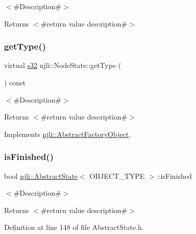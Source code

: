 $<$\#\+Description\#$>$

\begin{DoxyReturn}{Returns}
$<$\#return value description\#$>$ 
\end{DoxyReturn}
\mbox{\label{classnjli_1_1_node_state_a58607b67974806152c3483b40786b2de}} 
\subsubsection{\texorpdfstring{get\+Type()}{getType()}}
{\footnotesize\ttfamily virtual \mbox{\hyperlink{_util_8h_aa62c75d314a0d1f37f79c4b73b2292e2}{s32}} njli\+::\+Node\+State\+::get\+Type (\begin{DoxyParamCaption}{ }\end{DoxyParamCaption}) const\hspace{0.3cm}{\ttfamily [virtual]}}

$<$\#\+Description\#$>$

\begin{DoxyReturn}{Returns}
$<$\#return value description\#$>$ 
\end{DoxyReturn}


Implements \mbox{\hyperlink{classnjli_1_1_abstract_factory_object_a207c86146d40d0794708ae7f2d4e60a7}{njli\+::\+Abstract\+Factory\+Object}}.

\mbox{\label{classnjli_1_1_node_state_a4c7007210237496fbe169ba114c3750d}} 
\subsubsection{\texorpdfstring{is\+Finished()}{isFinished()}}
{\footnotesize\ttfamily bool \mbox{\hyperlink{classnjli_1_1_abstract_state}{njli\+::\+Abstract\+State}}$<$ O\+B\+J\+E\+C\+T\+\_\+\+T\+Y\+PE $>$\+::is\+Finished}

$<$\#\+Description\#$>$

\begin{DoxyReturn}{Returns}
$<$\#return value description\#$>$ 
\end{DoxyReturn}


Definition at line 148 of file Abstract\+State.\+h.


